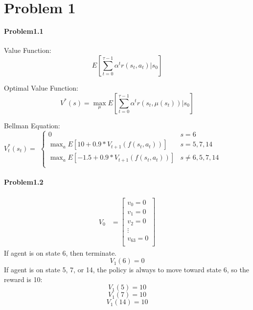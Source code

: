 \documentclass{article}
\begin{document}
\section{Problem 1}
\textbf{Problem1.1} \\ \\
Value Function:
\begin{equation}
    E[\sum_{t=0}^{\tau-1}\alpha^t r(s_t,a_t)|s_0]
\end{equation}

Optimal Value Function:
\begin{equation}
    V^*(s)=\max_\mu E[\sum_{t=0}^{\tau-1}\alpha^t r(s_t,\mu(s_t))|s_0]
\end{equation}

Bellman Equation:\\
$V^*_{t}(s_{t}) =$
$\begin{cases} 
    0 & s = 6 \\
    \max_a E[10 + 0.9 * V_{t+1}(f(s_t,a_t))] & s = 5, 7, 14 \\
     \max_a E[-1.5 + 0.9 * V_{t+1}(f(s_t,a_t))] & s \neq6, 5, 7, 14 \\
 \end{cases}$ \\\\
 \textbf{Problem1.2} \\ \\
\begin{align}
    V_0 &= \begin{bmatrix}
        v_0=0 \\
        v_1=0 \\
        v_2=0 \\
        \vdots \\
        v_{63}=0 \\
            \end{bmatrix}
    \end{align}
If agent is on state 6, then terminate.
\begin{equation}
    V_1(6) = 0
\end{equation}
If agent is on state 5, 7, or 14, the policy is always to move toward state 6, so the reward is 10:
\begin{equation}
    V_1(5) = 10
\end{equation}
\begin{equation}
    V_1(7) = 10
\end{equation}
\begin{equation}
    V_1(14) = 10
\end{equation}
\end{document}
